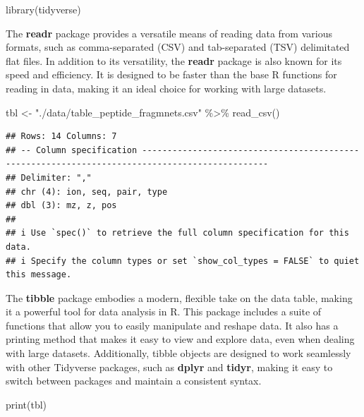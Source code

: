 \documentclass[
]{book}
\newenvironment{Shaded}{\begin{snugshade}}{\end{snugshade}}
\newcommand{\FunctionTok}[1]{\textcolor[rgb]{0.00,0.00,0.00}{#1}}
\newcommand{\NormalTok}[1]{#1}
\newcommand{\OtherTok}[1]{\textcolor[rgb]{0.56,0.35,0.01}{#1}}
\newcommand{\SpecialCharTok}[1]{\textcolor[rgb]{0.00,0.00,0.00}{#1}}
\newcommand{\StringTok}[1]{\textcolor[rgb]{0.31,0.60,0.02}{#1}}
\begin{document}
\begin{Shaded}
\begin{Highlighting}[]
\FunctionTok{library}\NormalTok{(tidyverse)}
\end{Highlighting}
\end{Shaded}

The \textbf{readr} package provides a versatile means of reading data from various formats, such as comma-separated (CSV) and tab-separated (TSV) delimitated flat files. In addition to its versatility, the \textbf{readr} package is also known for its speed and efficiency. It is designed to be faster than the base R functions for reading in data, making it an ideal choice for working with large datasets.

\begin{Shaded}
\begin{Highlighting}[]
\NormalTok{tbl }\OtherTok{\textless{}{-}} \StringTok{"./data/table\_peptide\_fragmnets.csv"} \SpecialCharTok{\%\textgreater{}\%} \FunctionTok{read\_csv}\NormalTok{()}
\end{Highlighting}
\end{Shaded}

\begin{verbatim}
## Rows: 14 Columns: 7
## -- Column specification -----------------------------------------------------------------------------------------------
## Delimiter: ","
## chr (4): ion, seq, pair, type
## dbl (3): mz, z, pos
## 
## i Use `spec()` to retrieve the full column specification for this data.
## i Specify the column types or set `show_col_types = FALSE` to quiet this message.
\end{verbatim}

The \textbf{tibble} package embodies a modern, flexible take on the data table, making it a powerful tool for data analysis in R. This package includes a suite of functions that allow you to easily manipulate and reshape data. It also has a printing method that makes it easy to view and explore data, even when dealing with large datasets. Additionally, tibble objects are designed to work seamlessly with other Tidyverse packages, such as \textbf{dplyr} and \textbf{tidyr}, making it easy to switch between packages and maintain a consistent syntax.

\begin{Shaded}
\begin{Highlighting}[]
\FunctionTok{print}\NormalTok{(tbl)}
\end{Highlighting}
\end{Shaded}
\end{document}
